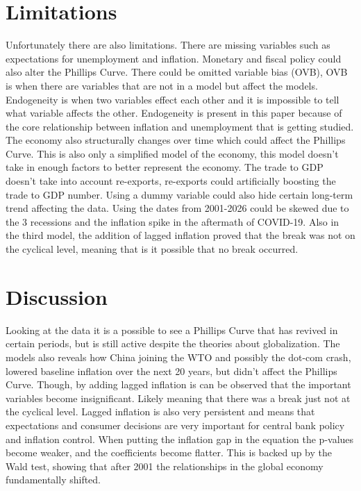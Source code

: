 \documentclass{article}
\begin{document}
\section{Limitations}
Unfortunately there are also limitations. There are missing variables such as expectations for unemployment and inflation. Monetary and fiscal policy could also alter the Phillips Curve. There could be omitted variable bias (OVB), OVB is when there are variables that are not in a model but affect the models. Endogeneity is when two variables effect each other and it is impossible to tell what variable affects the other. Endogeneity is present in this paper because of the core relationship between inflation and unemployment that is getting studied. The economy also structurally changes over time which could affect the Phillips Curve. This is also only a simplified model of the economy, this model doesn't take in enough factors to better represent the economy. The trade to GDP doesn't take into account re-exports, re-exports could artificially boosting the trade to GDP number. Using a dummy variable could also hide certain long-term trend affecting the data. Using the dates from 2001-2026 could be skewed due to the 3 recessions and the inflation spike in the aftermath of COVID-19. Also in the third model, the addition of lagged inflation proved that the break was not on the cyclical level, meaning that is it possible that no break occurred.

\section{Discussion}

Looking at the data it is a possible to see a Phillips Curve that has revived in certain periods, but is still active despite the theories about globalization. The models also reveals how China joining the WTO and possibly the dot-com crash, lowered baseline inflation over the next 20 years, but didn't affect the Phillips Curve. Though, by adding lagged inflation is can be observed that the important variables become insignificant. Likely meaning that there was a break just not at the cyclical level. Lagged inflation is also very persistent and means that expectations and consumer decisions are very important for central bank policy and inflation control. When putting the inflation gap in the equation the p-values become weaker, and the coefficients become flatter. This is backed up by the Wald test, showing that after 2001 the relationships in the global economy fundamentally shifted.
\end{document}
